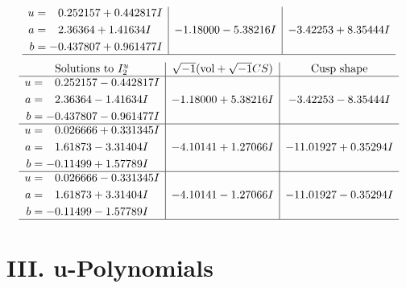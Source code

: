 \documentclass[1p]{elsarticle_modified}
\theoremstyle{definition}
\newcommand{\I}{\sqrt{-1}}
\begin{document}
$$\begin{array}{c|c|c}
\begin{aligned}
u &= \phantom{-}0.252157 + 0.442817 I \\
a &= \phantom{-}2.36364 + 1.41634 I \\
b &= -0.437807 + 0.961477 I\end{aligned}
 & -1.18000 - 5.38216 I & -3.42253 + 8.35444 I\\
 \hline 
 \end{array}$$\newpage$$\begin{array}{c|c|c}  
\text{Solutions to }I^u_{2}& \I (\text{vol} + \sqrt{-1}CS) & \text{Cusp shape}\\
 \hline 
\begin{aligned}
u &= \phantom{-}0.252157 - 0.442817 I \\
a &= \phantom{-}2.36364 - 1.41634 I \\
b &= -0.437807 - 0.961477 I\end{aligned}
 & -1.18000 + 5.38216 I & -3.42253 - 8.35444 I \\ \hline\begin{aligned}
u &= \phantom{-}0.026666 + 0.331345 I \\
a &= \phantom{-}1.61873 - 3.31404 I \\
b &= -0.11499 + 1.57789 I\end{aligned}
 & -4.10141 + 1.27066 I & -11.01927 + 0.35294 I \\ \hline\begin{aligned}
u &= \phantom{-}0.026666 - 0.331345 I \\
a &= \phantom{-}1.61873 + 3.31404 I \\
b &= -0.11499 - 1.57789 I\end{aligned}
 & -4.10141 - 1.27066 I & -11.01927 - 0.35294 I\\
 \hline 
 \end{array}$$\newpage
\newpage\renewcommand{\arraystretch}{1}
\centering \section*{ III. u-Polynomials}
\end{document}
